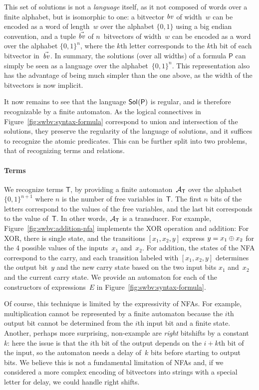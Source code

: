 %
This set of solutions is not a \emph{language} itself, as it not composed of
words over a finite alphabet, but is isomorphic to one: a bitvector $\mathit{bv}$ of
width~$w$ can be encoded as a word of length~$w$ over the alphabet $\{0,1\}$
using a big endian convention, and a tuple $\vec{\mathit{bv}}$ of $n$~bitvectors of
width~$w$ can be encoded as a word over the alphabet $\{0, 1\}^n$, where the $k$th letter
corresponds to the $k$th bit of each bitvector in~$\vec{\mathit{bv}}$.
%
In summary, the solutions (over all widths) of a formula $\mathsf{P}$ can simply
be seen as a language over the alphabet~$\{0,1\}^n$.
%
This representation also has the advantage of being much simpler than the one
above, as the width of the bitvectors is now implicit.

It now remains to see that the language $\mathsf{Sol}_{}(\mathsf{P})$ is regular, and is
therefore recognizable by a finite automaton.
%
As the logical connectives in Figure~\ref{fig:swbv:syntax-formula} correspond to union
and intersection of the solutions, they preserve the regularity of the language
of solutions, and it suffices to recognize the atomic predicates.
%
This can be further split into two problems, that of recognizing terms and relations.

\paragraph{Terms}
We recognize terms $\mathsf{T}$, by providing a finite
automaton~$\mathcal{A}_{\mathsf{T}}$ over the alphabet~$\{0,1\}^{n+1}$ where $n$ is
the number of free variables in~$\mathsf{T}$. The first $n$ bits of the
letters correspond to the values of the free variables, and the last bit
corresponds to the value of~$\mathsf{T}$. In other words, $\mathcal{A}_{\mathsf{T}}$
is a transducer. For example, Figure~\ref{fig:swbv:addition-nfa} implements the XOR
operation and addition:
%
For XOR, there is single state, and the transitions $[x_1, x_2, y]$
express $y = x_1 \oplus x_2$ for the 4 possible values of the
inputs~$x_1$ and~$x_2$.
%
For addition, the states of the NFA correspond to the carry, and each
transition labeled with $[x_1, x_2, y]$ determines the output bit~$y$ and the
new carry state based on the two input bits $x_1$ and~$x_2$ and the current
carry state.
%
We provide an automaton for each of the constructors of
expressions~$E$ in Figure~\ref{fig:swbv:syntax-formula}.

Of course, this technique is limited by the expressivity of NFAs.
%
For example, multiplication cannot be represented by a finite automaton
because the $i$th output bit cannot be determined from the $i$th input bit and
a finite state.
%
Another, perhaps more surprising, non-example are \emph{right} bitshifts by a
constant~$k$: here the issue is that the $i$th bit of the output depends on the
$i+k$th bit of the input, so the automaton needs a delay of~$k$ bits before
starting to output bits.
%
We believe this is not a fundamental limitation of NFAs and, if we considered
a more complex encoding of bitvectors into strings with a special letter for
delay, we could handle right shifts.

